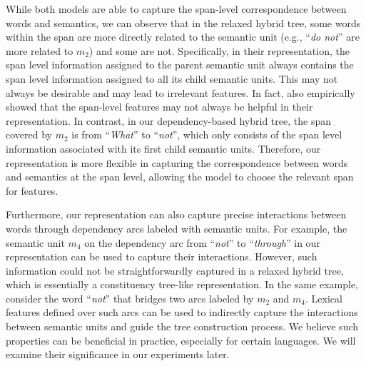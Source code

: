 While both models are able to capture the span-level correspondence between words and semantics,
we can observe that in the relaxed hybrid tree, some words within the span are more directly related to the semantic unit (e.g., ``{\em do not}'' are more related to $m_2$) and some are not.
Specifically, in their representation, the span level information assigned to the parent semantic unit always contains the span level information assigned to all its child semantic units.
This may not always be desirable and may lead to irrelevant features.
In fact, \citet{lu2014semantic} also empirically showed that the span-level features may not always be helpful in their representation.
In contrast, in our {dependency-based hybrid tree}, the span covered by $m_2$ is from ``{\em What}'' to ``{\em not}'', which only consists of the span level information associated with its first child semantic units.
Therefore, our representation is more flexible in capturing the correspondence between words and semantics at the span level, allowing the model to choose the relevant span for features.


Furthermore, our representation can also capture precise interactions between words through  dependency arcs labeled with semantic units.
For example, the semantic unit $m_4$ on the dependency arc from  ``{\em not}'' to ``{\em through}'' in our representation can be used to capture their interactions. 
However, such information could not be straightforwardly captured in a relaxed hybrid tree, which is essentially a constituency tree-like representation.
In the same example, consider the word ``{\em not}'' that bridges  two arcs labeled by $m_2$ and $m_4$. 
Lexical features defined over such arcs can be used to indirectly capture the interactions between  semantic units and guide the tree construction process.
We believe such properties can be beneficial in practice, especially for certain languages. We will examine their significance   in our experiments later.

